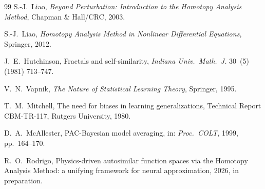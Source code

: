\documentclass[12pt]{article}
\begin{document}
\begin{thebibliography}{99}
S.-J.~Liao,
\emph{Beyond Perturbation: Introduction to the Homotopy Analysis
Method}, Chapman \& Hall/CRC, 2003.

S.-J.~Liao,
\emph{Homotopy Analysis Method in Nonlinear Differential Equations},
Springer, 2012.

J.~E.~Hutchinson,
Fractals and self-similarity,
\emph{Indiana Univ.\ Math.\ J.} 30~(5) (1981) 713--747.

V.~N.~Vapnik,
\emph{The Nature of Statistical Learning Theory}, Springer, 1995.

T.~M.~Mitchell,
The need for biases in learning generalizations,
Technical Report CBM-TR-117, Rutgers University, 1980.

D.~A.~McAllester,
PAC-Bayesian model averaging,
in: \emph{Proc.\ COLT}, 1999, pp.~164--170.

R.~O.~Rodrigo,
Physics-driven autosimilar function spaces via the Homotopy Analysis
Method: a unifying framework for neural approximation,
2026, in preparation.

\end{thebibliography}
\end{document}
